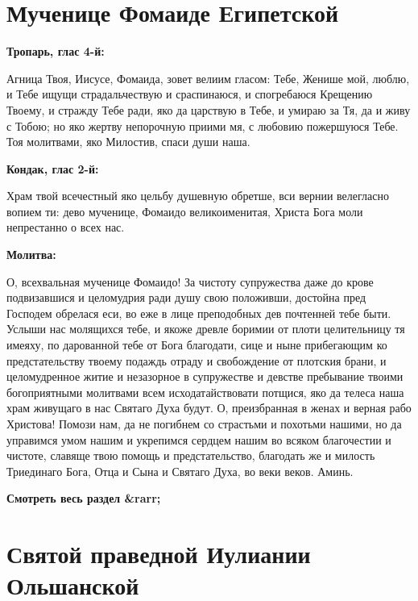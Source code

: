 \section{Мученице Фомаиде Египетской}
 


\bfseries Тропарь, глас 4-й:\normalfont{}

 Агница Твоя, Иисусе, Фомаида, зовет велиим гласом: Тебе, Женише мой, люблю, и Тебе ищущи страдальчествую и сраспинаюся, и спогребаюся Крещению Твоему, и стражду Тебе ради, яко да царствую в Тебе, и умираю за Тя, да и живу с Тобою; но яко жертву непорочную приими мя, с любовию пожершуюся Тебе. Тоя молитвами, яко Милостив, спаси души наша.


\bfseries Кондак, глас 2-й:\normalfont{}

 Храм твой всечестный яко цельбу душевную обретше, вси вернии велегласно вопием ти: дево мученице, Фомаидо великоименитая, Христа Бога моли непрестанно о всех нас.


\bfseries Молитва:\normalfont{}

 О, всехвальная мученице Фомаидо! За чистоту супружества даже до крове подвизавшися и целомудрия ради душу свою положивши, достойна пред Господем обрелася еси, во еже в лице преподобных дев почтенней тебе быти. Услыши нас молящихся тебе, и якоже древле боримии от плоти целительницу тя имеяху, по дарованной тебе от Бога благодати, сице и ныне прибегающим ко предстательству твоему подаждь отраду и свобождение от плотския брани, и целомудренное житие и незазорное в супружестве и девстве пребывание твоими богоприятными молитвами всем исходатайствовати потщися, яко да телеса наша храм живущаго в нас Святаго Духа будут. О, преизбранная в женах и верная рабо Христова! Помози нам, да не погибнем со страстьми и похотьми нашими, но да управимся умом нашим и укрепимся сердцем нашим во всяком благочестии и чистоте, славяще твою помощь и предстательство, благодать же и милость Триединаго Бога, Отца и Сына и Святаго Духа, во веки веков. Аминь. 


\mychapterending


\bfseries Смотреть весь раздел &rarr;\normalfont{} 

\section{Святой праведной Иулиании Ольшанской}
 


